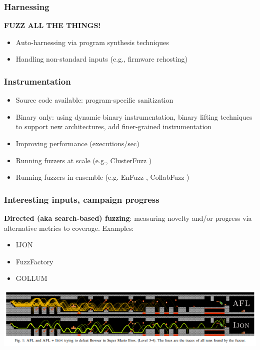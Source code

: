 \documentclass{beamer}
\begin{document}
\begin{frame}
	\frametitle{Harnessing}
	\textbf{FUZZ ALL THE THINGS!}

	\begin{itemize}
		\item{Auto-harnessing via program synthesis techniques}
		\item{Handling non-standard inputs (e.g., firmware rehosting)}
	\end{itemize}

\end{frame}

\begin{frame}
	\frametitle{Instrumentation}

	\begin{itemize}
		\item{Source code available: program-specific sanitization}
		\item{Binary only: using dynamic binary instrumentation, binary lifting techniques to support new architectures, add finer-grained instrumentation}
		\item{Improving performance (executions/sec)} %
		\item{Running fuzzers at scale (e.g., ClusterFuzz \cite{clusterfuzz})}
		\item{Running fuzzers in ensemble (e.g. EnFuzz \cite{enfuzz}, CollabFuzz \cite{collabfuzz})}
		
	\end{itemize}

\end{frame}

\begin{frame}
	\frametitle{Interesting inputs, campaign progress}

	\textbf{Directed (aka search-based) fuzzing}: measuring novelty and/or progress via alternative metrics to coverage. Examples: \begin{itemize}
		\item{IJON \cite{ijon}}
		\item{FuzzFactory \cite{fuzzfactory}}
		\item{GOLLUM \cite{gollum}}
	\end{itemize}

	\vspace{\baselineskip}
	\centering \includegraphics[scale=.5]{ijon}
\end{frame}
\end{document}
